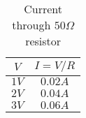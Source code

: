 \begin{table}[ht]
	\begin{center}
	\caption{Current through $50 \Omega$ resistor}
	\label{tab:table_ohm}
		\begin{tabular}{cc}
		\toprule
			$V$ & $I=V/R$\\
			\midrule
			$1 V$ & $0.02 A$\\
			$2 V$ & $0.04 A$\\
			$3 V$ & $0.06 A$\\
		\bottomrule
		\end{tabular}
	\end{center}
\end{table}